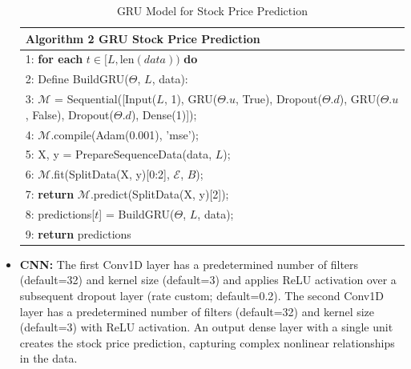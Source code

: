 \begin{itemize}
    \begin{table}[h]
    \small
    \centering
    \begin{tabular}{|p{10cm}|}
    \hline
    \textbf{Algorithm 2 GRU Stock Price Prediction} \\
    \hline
    1: \textbf{for each} $t \in [L, \text{len}(data))$ \textbf{do} \\
    2: \quad Define BuildGRU($\Theta$, $L$, data): \\
    3: \quad\quad $\mathcal{M}$ = Sequential([Input($L$, 1), GRU($\Theta.u$, True), Dropout($\Theta.d$), GRU($\Theta.u$, False), Dropout($\Theta.d$), Dense(1)]); \\
    4: \quad\quad $\mathcal{M}$.compile(Adam(0.001), 'mse'); \\
    5: \quad\quad X, y = PrepareSequenceData(data, $L$); \\
    6: \quad\quad $\mathcal{M}$.fit(SplitData(X, y)[0:2], $\mathcal{E}$, $B$); \\
    7: \quad\quad \textbf{return} $\mathcal{M}$.predict(SplitData(X, y)[2]); \\
    8: \quad predictions[$t$] = BuildGRU($\Theta$, $L$, data); \\
    9: \textbf{return} predictions \\
    \hline
    \end{tabular}
    \caption{GRU Model for Stock Price Prediction}
    \label{tab:gru_predictor}
    \end{table}
    
    \item \textbf{CNN: }  The first Conv1D layer has a predetermined number of filters (default=32) and kernel size (default=3) and applies ReLU activation over a subsequent dropout layer (rate custom; default=0.2). The second Conv1D layer has a predetermined number of filters (default=32) and kernel size (default=3) with ReLU activation. An output dense layer with a single unit creates the stock price prediction, capturing complex nonlinear relationships in the data.
    

\end{itemize}
